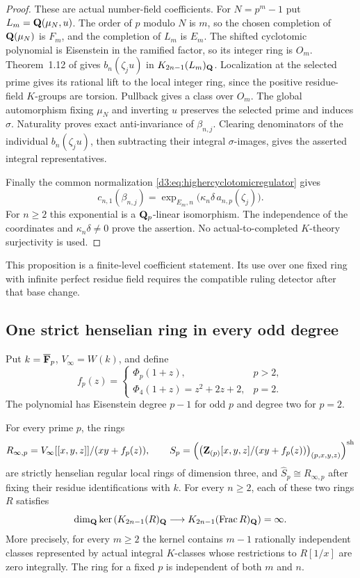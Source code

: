 \begin{proof}
These are actual number-field coefficients. For $N=p^m-1$ put
$L_m=\mathbf Q(\mu_N,u)$.
The order of $p$ modulo $N$ is $m$, so the chosen completion
of $\mathbf Q(\mu_N)$ is $F_m$, and the completion of $L_m$ is $E_m$.
The shifted cyclotomic polynomial is Eisenstein in the ramified
factor, so its integer ring is $O_m$.
Theorem~1.12 of \cite{BesserDeJeu} gives $b_n(\zeta_ju)$ in
$K_{2n-1}(L_m)_{\mathbf Q}$.
Localization at the selected prime gives its rational lift to the
local integer ring, since the positive residue-field $K$-groups
are torsion. Pullback gives a class over $O_m$.
The global automorphism fixing $\mu_N$ and inverting $u$ preserves
the selected prime and induces $\sigma$.
Naturality proves exact anti-invariance of $\beta_{n,j}$.
Clearing denominators of the individual $b_n(\zeta_ju)$, then
subtracting their integral $\sigma$-images, gives the asserted
integral representatives.

Finally the common normalization
\eqref{d3:eq:highercyclotomicregulator} gives
\[
 c_{n,1}(\beta_{n,j})
 =\exp_{E_m,n}\bigl(\kappa_n\delta\,a_{n,p}(\zeta_j)\bigr).
\]
For $n\geq2$ this exponential is a $\mathbf Q_p$-linear isomorphism.
The independence of the coordinates and $\kappa_n\delta\ne0$
prove the assertion. No actual-to-completed $K$-theory
surjectivity is used.
\end{proof}

This proposition is a finite-level coefficient statement.
Its use over one fixed ring with infinite perfect residue field
requires the compatible ruling detector after that base change.


\subsection{One strict henselian ring in every odd degree}
\label{d3:sec:strictallprimeallodd}

Put $k=\overline{\mathbf F}_p$, $V_\infty=W(k)$, and define
\[
 f_p(z)=
 \begin{cases}
  \Phi_p(1+z),&p>2,\\
  \Phi_4(1+z)=z^2+2z+2,&p=2.
 \end{cases}
\]
The polynomial has Eisenstein degree $p-1$ for odd $p$ and degree
two for $p=2$.

\begin{theorem}\label{d3:thm:strictallprimeallodd}
For every prime $p$, the rings
\[
 R_{\infty,p}=V_\infty[[x,y,z]]/(xy+f_p(z)),\qquad
 S_p=\left(
  \bigl(\mathbf Z_{(p)}[x,y,z]/(xy+f_p(z))\bigr)_{(p,x,y,z)}
       \right)^{\mathrm{sh}}
\]
are strictly henselian regular local rings of dimension three,
and $\widehat S_p\cong R_{\infty,p}$ after fixing their residue
identifications with $k$.
For every $n\geq2$, each of these two rings $R$ satisfies
\[
 \dim_{\mathbf Q}\ker\left(
 K_{2n-1}(R)_{\mathbf Q}\longrightarrow
 K_{2n-1}(\operatorname{Frac} R)_{\mathbf Q}\right)=\infty.
\]
More precisely, for every $m\geq2$ the kernel contains $m-1$
rationally independent classes represented by actual integral
$K$-classes whose restrictions to $R[1/x]$ are zero integrally.
The ring for a fixed $p$ is independent of both $m$ and $n$.
\end{theorem}

